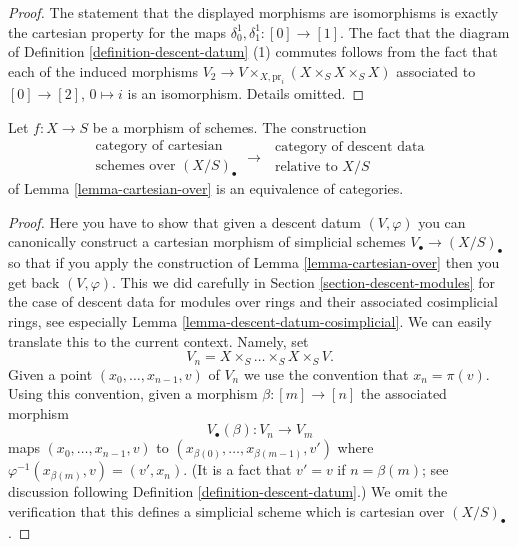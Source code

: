 \begin{proof}
The statement that the displayed morphisms are isomorphisms
is exactly the cartesian property for the maps
$\delta^1_0, \delta^1_1 : [0] \to [1]$. The fact that the diagram
of Definition \ref{definition-descent-datum} (1) commutes
follows from the fact that each of the induced morphisms
$V_2 \to V \times_{X, \text{pr}_i} (X \times_S X \times_S X)$
associated to $[0] \to [2]$, $0 \mapsto i$
is an isomorphism. Details omitted.
\end{proof}

\begin{lemma}
\label{lemma-cartesian-equivalent-descent-datum}
Let $f : X \to S$ be a morphism of schemes. The construction
$$
\begin{matrix}
\text{category of cartesian } \\
\text{schemes over } (X/S)_\bullet
\end{matrix}
\longrightarrow
\begin{matrix}
\text{ category of descent data} \\
\text{ relative to } X/S
\end{matrix}
$$
of Lemma \ref{lemma-cartesian-over}
is an equivalence of categories.
\end{lemma}

\begin{proof}
Here you have to show that given a descent datum
$(V, \varphi)$ you can canonically construct a
cartesian morphism of simplicial schemes
$V_\bullet \to (X/S)_\bullet$ so that if you apply
the construction of Lemma \ref{lemma-cartesian-over}
then you get back $(V, \varphi)$. This we did carefully
in Section \ref{section-descent-modules}
for the case of descent data for modules over rings
and their associated cosimplicial rings, see especially
Lemma \ref{lemma-descent-datum-cosimplicial}.
We can easily translate this to the current context.
Namely, set
$$
V_n = X \times_S \ldots \times_S X \times_S V.
$$
Given a point $(x_0, \ldots, x_{n - 1}, v)$ of $V_n$
we use the convention that $x_n = \pi(v)$. Using this
convention, given a morphism $\beta : [m] \to [n]$
the associated morphism
$$
V_\bullet(\beta) : V_n \longrightarrow V_m
$$
maps $(x_0, \ldots, x_{n - 1}, v)$ to
$(x_{\beta(0)}, \ldots, x_{\beta(m - 1)}, v')$
where $\varphi^{-1}(x_{\beta(m)}, v) = (v', x_n)$.
(It is a fact that $v' = v$ if $n = \beta(m)$; see discussion
following Definition \ref{definition-descent-datum}.)
We omit the verification that this defines a
simplicial scheme which is cartesian over
$(X/S)_\bullet$.
\end{proof}

